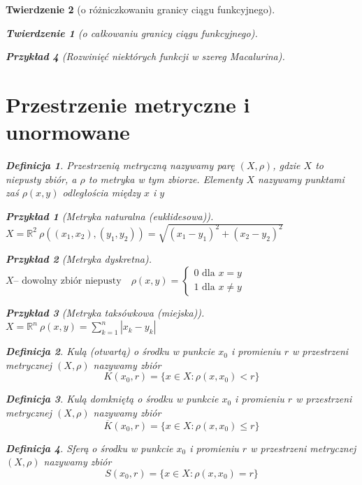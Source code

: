 \documentclass[12pt,a4paper]{article}
\newtheorem{tw}{Twierdzenie}
\newtheorem{przyklad}{Przykład}
\theoremstyle{definition}
\newtheorem{df}{Definicja}
\begin{document}
\begin{tw}[o różniczkowaniu granicy ciągu funkcyjnego]
\begin{tw}[o całkowaniu granicy ciągu funkcyjnego]
\begin{przyklad}[Rozwinięć niektórych funkcji w szereg Macalurina]
\section{Przestrzenie metryczne i unormowane}
\begin{df}
Przestrzenią metryczną nazywamy parę $(X, \rho)$, gdzie $X$ to niepusty zbiór, a $\rho$ to metryka w tym zbiorze. Elementy $X$ nazywamy punktami zaś $\rho (x,y)$ odległościa między $x$ i $y$ 
\end{df}
\begin{przyklad}[Metryka naturalna (euklidesowa)]
$X = \mathbb{R}^2 ~\rho((x_1,x_2),(y_1, y_2)) = \sqrt{(x_1-y_1)^2+(x_2-y_2)^2}$
\end{przyklad}
\begin{przyklad}[Metryka dyskretna]
$X \text{-- dowolny zbiór niepusty} \quad \rho(x,y) = 
\begin{cases}
0 \text{ dla } x = y\\
1 \text{ dla } x \neq y
\end{cases}$
\end{przyklad}
\begin{przyklad}[Metryka taksówkowa (miejska)]
$X = \mathbb{R}^n ~\rho(x, y) = \sum\limits_{k=1}^n |x_k-y_k|$
\end{przyklad}

\begin{df}
Kulą (otwartą) o środku w punkcie $x_0$ i promieniu $r$ w przestrzeni metrycznej $(X, \rho)$ nazywamy zbiór $$K(x_0, r) = \{x\in X: \rho(x,x_0) < r\}$$
\end{df}
\begin{df}
Kulą domkniętą o środku w punkcie $x_0$ i promieniu $r$ w przestrzeni metrycznej $(X, \rho)$ nazywamy zbiór $$\overline{K}(x_0, r) = \{x\in X: \rho(x,x_0) \leqslant r\}$$
\end{df}
\begin{df}
Sferą o środku w punkcie $x_0$ i promieniu $r$ w przestrzeni metrycznej $(X, \rho)$ nazywamy zbiór $$S(x_0, r) = \{x\in X: \rho(x,x_0) = r\}$$
\end{df}


\end{przyklad}
\end{tw}
\end{tw}
\end{document}
